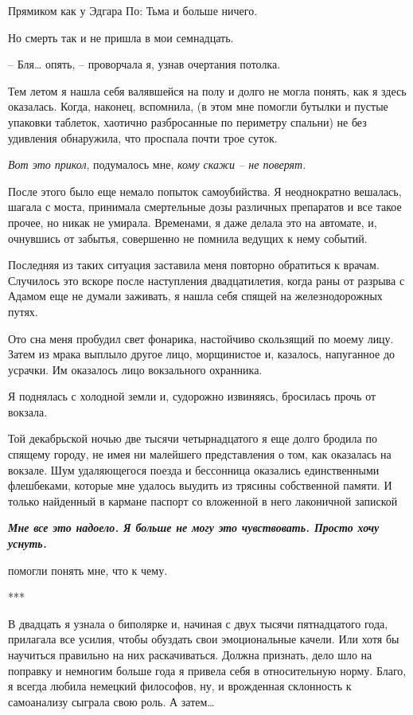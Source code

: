 \documentclass[
]{book}
\begin{document}
Прямиком как у Эдгара По: Тьма и больше ничего.

Но смерть так и не пришла в мои семнадцать.

-- Бля\ldots{} опять, -- проворчала я, узнав очертания потолка.

Тем летом я нашла себя валявшейся на полу и долго не могла понять, как я здесь оказалась. Когда, наконец, вспомнила, (в этом мне помогли бутылки и пустые упаковки таблеток, хаотично разбросанные по периметру спальни) не без удивления обнаружила, что проспала почти трое суток.

\emph{Вот это прикол}, подумалось мне, \emph{кому скажи -- не поверят.}

После этого было еще немало попыток самоубийства. Я неоднократно вешалась, шагала с моста, принимала смертельные дозы различных препаратов и все такое прочее, но никак не умирала. Временами, я даже делала это на автомате, и, очнувшись от забытья, совершенно не помнила ведущих к нему событий.

Последняя из таких ситуация заставила меня повторно обратиться к врачам. Случилось это вскоре после наступления двадцатилетия, когда раны от разрыва с Адамом еще не думали заживать, я нашла себя спящей на железнодорожных путях.

Ото сна меня пробудил свет фонарика, настойчиво скользящий по моему лицу. Затем из мрака выплыло другое лицо, морщинистое и, казалось, напуганное до усрачки. Им оказалось лицо вокзального охранника.

Я поднялась с холодной земли и, судорожно извиняясь, бросилась прочь от вокзала.

Той декабрьской ночью две тысячи четырнадцатого я еще долго бродила по спящему городу, не имея ни малейшего представления о том, как оказалась на вокзале. Шум удаляющегося поезда и бессонница оказались единственными флешбеками, которые мне удалось выудить из трясины собственной памяти. И только найденный в кармане паспорт со вложенной в него лаконичной запиской

\textbf{\emph{Мне все это надоело. Я больше не могу это чувствовать. Просто хочу уснуть.}}

помогли понять мне, что к чему.

***

В двадцать я узнала о биполярке и, начиная с двух тысячи пятнадцатого года, прилагала все усилия, чтобы обуздать свои эмоциональные качели. Или хотя бы научиться правильно на них раскачиваться. Должна признать, дело шло на поправку и немногим больше года я привела себя в относительную норму. Благо, я всегда любила немецкий философов, ну, и врожденная склонность к самоанализу сыграла свою роль. А затем\ldots{}
\end{document}

